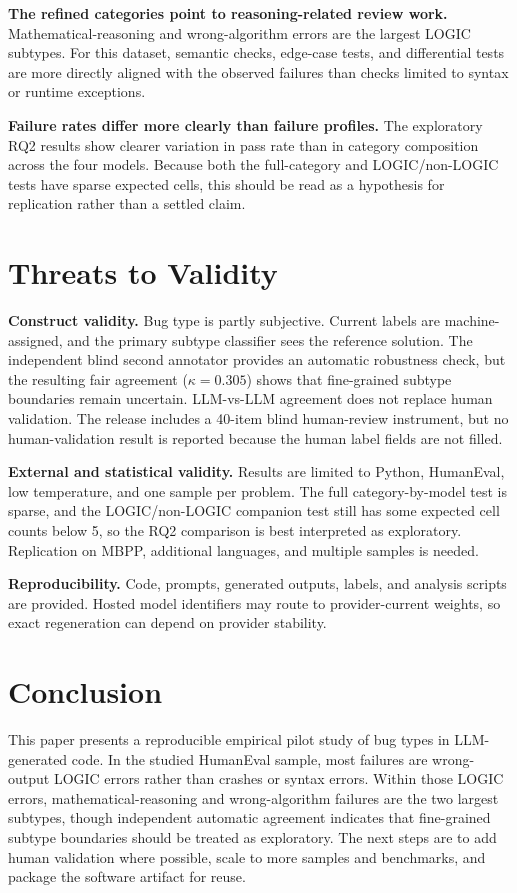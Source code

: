 \documentclass[10pt,journal]{article}
\begin{document}
\textbf{The refined categories point to reasoning-related review work.}
Mathematical-reasoning and wrong-algorithm errors are the largest LOGIC subtypes.
For this dataset, semantic checks, edge-case tests, and differential tests are
more directly aligned with the observed failures than checks limited to syntax or
runtime exceptions.

\textbf{Failure rates differ more clearly than failure profiles.}
The exploratory RQ2 results show clearer variation in pass rate than in category
composition across the four models. Because both the full-category and
LOGIC/non-LOGIC tests have sparse expected cells, this should be read as a
hypothesis for replication rather than a settled claim.

\section{Threats to Validity}
\label{sec:threats}
\textbf{Construct validity.} Bug type is partly subjective. Current labels are
machine-assigned, and the primary subtype classifier sees the reference solution.
The independent blind second annotator provides an automatic robustness check, but
the resulting fair agreement ($\kappa=0.305$) shows that fine-grained subtype
boundaries remain uncertain. LLM-vs-LLM agreement does not replace human
validation. The release includes a 40-item blind human-review instrument, but no
human-validation result is reported because the human label fields are not filled.

\textbf{External and statistical validity.} Results are limited to Python,
HumanEval, low temperature, and one sample per problem. The full category-by-model
test is sparse, and the LOGIC/non-LOGIC companion test still has some expected
cell counts below 5, so the RQ2 comparison is best interpreted as exploratory.
Replication on MBPP, additional languages, and multiple samples is needed.

\textbf{Reproducibility.} Code, prompts, generated outputs, labels, and analysis
scripts are provided. Hosted model identifiers may route to provider-current
weights, so exact regeneration can depend on provider stability.

\section{Conclusion}
This paper presents a reproducible empirical pilot study of bug types in
LLM-generated code. In the studied HumanEval sample, most failures are
wrong-output LOGIC errors rather than crashes or syntax errors. Within those LOGIC errors,
mathematical-reasoning and wrong-algorithm failures are the two largest subtypes,
though independent automatic agreement indicates that fine-grained subtype
boundaries should be treated as exploratory. The next steps are to add human
validation where possible, scale to more samples and benchmarks, and package the
software artifact for reuse.



\end{document}
